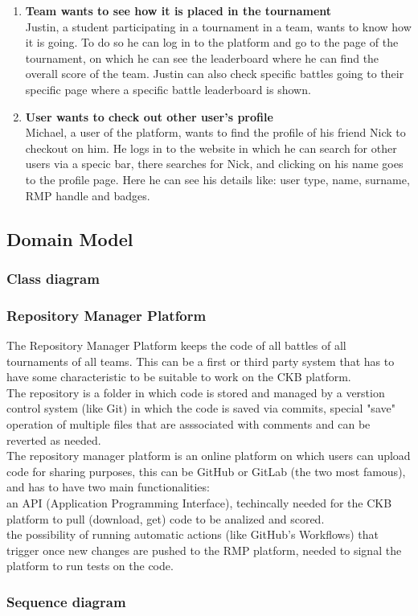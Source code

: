 \begin{enumerate}[label=$\bullet$ \textbf{SC\arabic*:}]
    \item \textbf{Team wants to see how it is placed in the tournament}\\ Justin, a student participating in a tournament in a team, wants to know how it is going. To do so he can log in to the platform and go to the page of the tournament, on which he can see the leaderboard where he can find the overall score of the team. Justin can also check specific battles going to their specific page where a specific battle leaderboard is shown.
    \item \textbf{User wants to check out other user's profile}\\ Michael, a user of the platform, wants to find the profile of his friend Nick to checkout on him. He logs in to the website in which he can search for other users via a specic bar, there searches for Nick, and clicking on his name goes to the profile page. Here he can see his details like: user type, name, surname, RMP handle and badges.
\end{enumerate}
\subsection{Domain Model}
\subsubsection{Class diagram}
\subsubsection{Repository Manager Platform}
The Repository Manager Platform keeps the code of all battles of all tournaments of all teams. This can be a first or third party system that has to have some characteristic to be suitable to work on the CKB platform.\\
The repository is a folder in which code is stored and managed by a verstion control system (like Git) in which the code is saved via commits, special "save" operation of multiple files that are asssociated with comments and can be reverted as needed.\\
The repository manager platform is an online platform on which users can upload code for sharing purposes, this can be GitHub or GitLab (the two most famous), and has to have two main functionalities:\\
    an API (Application Programming Interface), techincally needed for the CKB platform to pull (download, get) code to be analized and scored.\\
    the possibility of running automatic actions (like GitHub's Workflows) that trigger once new changes are pushed to the RMP platform, needed to signal the platform to run tests on the code.
\subsubsection{Sequence diagram}